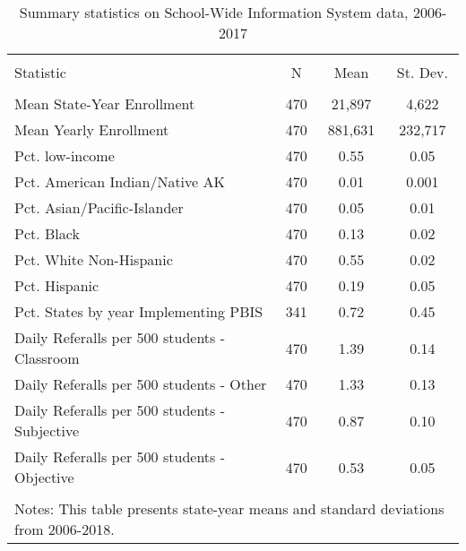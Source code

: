 
\begin{table}[!htbp] \centering 
  \caption{Summary statistics on School-Wide Information System data, 2006-2017} 
  \label{tab:descriptives} 
\begin{tabular}{@{\extracolsep{5pt}}lccc} 
\\[-1.8ex]\hline 
\hline \\[-1.8ex] 
Statistic & \multicolumn{1}{c}{N} & \multicolumn{1}{c}{Mean} & \multicolumn{1}{c}{St. Dev.} \\ 
\hline \\[-1.8ex] 
Mean State-Year Enrollment & 470 & 21,897 & 4,622 \\ 
Mean Yearly Enrollment & 470 & 881,631 & 232,717 \\ 
Pct. low-income & 470 & 0.55 & 0.05 \\ 
Pct. American Indian/Native AK & 470 & 0.01 & 0.001 \\ 
Pct. Asian/Pacific-Islander & 470 & 0.05 & 0.01 \\ 
Pct. Black & 470 & 0.13 & 0.02 \\ 
Pct. White Non-Hispanic & 470 & 0.55 & 0.02 \\ 
Pct. Hispanic & 470 & 0.19 & 0.05 \\ 
Pct. States by year Implementing PBIS & 341 & 0.72 & 0.45 \\ 
Daily Referalls per 500 students - Classroom & 470 & 1.39 & 0.14 \\ 
Daily Referalls per 500 students - Other & 470 & 1.33 & 0.13 \\ 
Daily Referalls per 500 students - Subjective & 470 & 0.87 & 0.10 \\ 
Daily Referalls per 500 students - Objective & 470 & 0.53 & 0.05 \\ 
\hline \\[-1.8ex] 
\multicolumn{4}{l}{Notes: This table presents state-year means and standard deviations from 2006-2018.} \\ 
\end{tabular} 
\end{table} 

